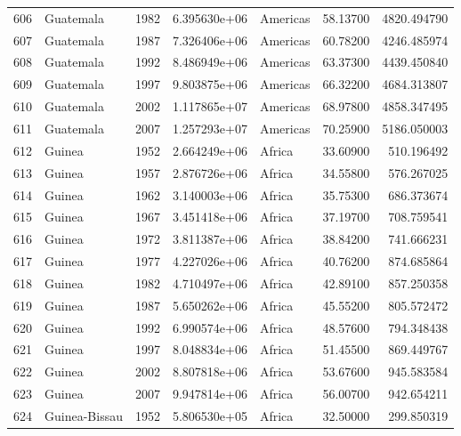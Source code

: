\documentclass[
  letterpaper,
  DIV=11,
  numbers=noendperiod]{scrreprt}
\begin{document}
\begin{tabular}{llrrlrr}
606  &                 Guatemala &  1982 &  6.395630e+06 &  Americas &  58.13700 &    4820.494790 \\
607  &                 Guatemala &  1987 &  7.326406e+06 &  Americas &  60.78200 &    4246.485974 \\
608  &                 Guatemala &  1992 &  8.486949e+06 &  Americas &  63.37300 &    4439.450840 \\
609  &                 Guatemala &  1997 &  9.803875e+06 &  Americas &  66.32200 &    4684.313807 \\
610  &                 Guatemala &  2002 &  1.117865e+07 &  Americas &  68.97800 &    4858.347495 \\
611  &                 Guatemala &  2007 &  1.257293e+07 &  Americas &  70.25900 &    5186.050003 \\
612  &                    Guinea &  1952 &  2.664249e+06 &    Africa &  33.60900 &     510.196492 \\
613  &                    Guinea &  1957 &  2.876726e+06 &    Africa &  34.55800 &     576.267025 \\
614  &                    Guinea &  1962 &  3.140003e+06 &    Africa &  35.75300 &     686.373674 \\
615  &                    Guinea &  1967 &  3.451418e+06 &    Africa &  37.19700 &     708.759541 \\
616  &                    Guinea &  1972 &  3.811387e+06 &    Africa &  38.84200 &     741.666231 \\
617  &                    Guinea &  1977 &  4.227026e+06 &    Africa &  40.76200 &     874.685864 \\
618  &                    Guinea &  1982 &  4.710497e+06 &    Africa &  42.89100 &     857.250358 \\
619  &                    Guinea &  1987 &  5.650262e+06 &    Africa &  45.55200 &     805.572472 \\
620  &                    Guinea &  1992 &  6.990574e+06 &    Africa &  48.57600 &     794.348438 \\
621  &                    Guinea &  1997 &  8.048834e+06 &    Africa &  51.45500 &     869.449767 \\
622  &                    Guinea &  2002 &  8.807818e+06 &    Africa &  53.67600 &     945.583584 \\
623  &                    Guinea &  2007 &  9.947814e+06 &    Africa &  56.00700 &     942.654211 \\
624  &             Guinea-Bissau &  1952 &  5.806530e+05 &    Africa &  32.50000 &     299.850319 \\

\end{tabular}
\end{document}
